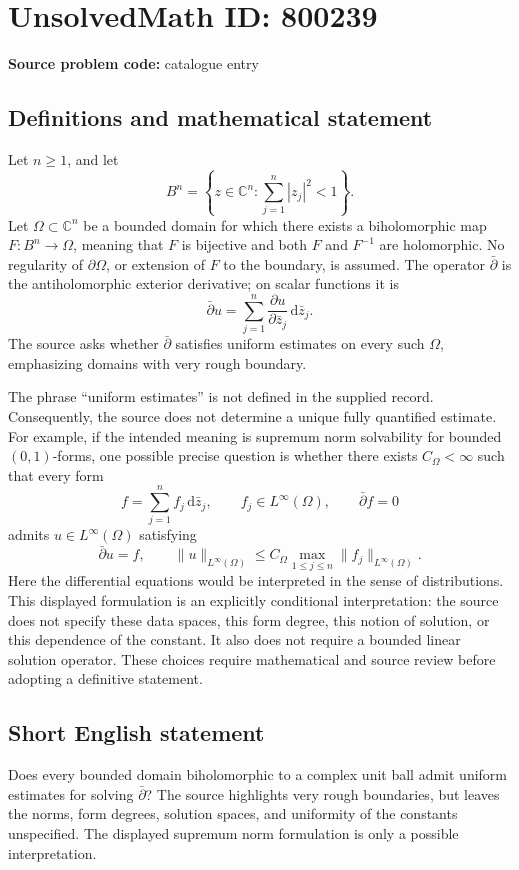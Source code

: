 \documentclass[11pt]{article}
\newcommand{\C}{\mathbb{C}}
\begin{document}
\section*{UnsolvedMath ID: 800239}
\textbf{Source problem code:} catalogue entry
\subsection{Definitions and mathematical statement}
Let \(n\geq 1\), and let
\[
B^n=\left\{z\in\C^n:\sum_{j=1}^n|z_j|^2<1\right\}.
\]
Let \(\Omega\subset\C^n\) be a bounded domain for which there exists a biholomorphic map \(F:B^n\to\Omega\), meaning that \(F\) is bijective and both \(F\) and \(F^{-1}\) are holomorphic. No regularity of \(\partial\Omega\), or extension of \(F\) to the boundary, is assumed. The operator \(\bar\partial\) is the antiholomorphic exterior derivative; on scalar functions it is
\[
\bar\partial u=\sum_{j=1}^n\frac{\partial u}{\partial\bar z_j}\,\mathrm d\bar z_j.
\]
The source asks whether \(\bar\partial\) satisfies uniform estimates on every such \(\Omega\), emphasizing domains with very rough boundary.

The phrase ``uniform estimates'' is not defined in the supplied record. Consequently, the source does not determine a unique fully quantified estimate. For example, if the intended meaning is supremum norm solvability for bounded \((0,1)\)-forms, one possible precise question is whether there exists \(C_\Omega<\infty\) such that every form
\[
f=\sum_{j=1}^n f_j\,\mathrm d\bar z_j,
\qquad f_j\in L^\infty(\Omega),\qquad \bar\partial f=0
\]
admits \(u\in L^\infty(\Omega)\) satisfying
\[
\bar\partial u=f,\qquad
\|u\|_{L^\infty(\Omega)}\leq C_\Omega\max_{1\leq j\leq n}\|f_j\|_{L^\infty(\Omega)}.
\]
Here the differential equations would be interpreted in the sense of distributions. This displayed formulation is an explicitly conditional interpretation: the source does not specify these data spaces, this form degree, this notion of solution, or this dependence of the constant. It also does not require a bounded linear solution operator. These choices require mathematical and source review before adopting a definitive statement.
\subsection{Short English statement}
Does every bounded domain biholomorphic to a complex unit ball admit uniform estimates for solving \(\bar\partial\)? The source highlights very rough boundaries, but leaves the norms, form degrees, solution spaces, and uniformity of the constants unspecified. The displayed supremum norm formulation is only a possible interpretation.
\end{document}
